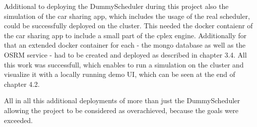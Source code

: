 Additional to deploying the DummyScheduler during this project also the simulation of the car sharing app, which includes the usage of the real scheduler, could be successfully deployed on the cluster. This needed the docker contaienr of the car sharing app to include a small part of the cplex engine. Additionally for that an extended docker container for each - the mongo database as well as the OSRM service - had to be created and deployed as described in chapter 3.4. All this work was successfull, which enables to run a simulation on the cluster and visualize it with a locally running demo UI, which can be seen at the end of chapter 4.2.

All in all this additional deployments of more than just the DummyScheduler allowing the project to be considered as overachieved, because the goals were exceeded.